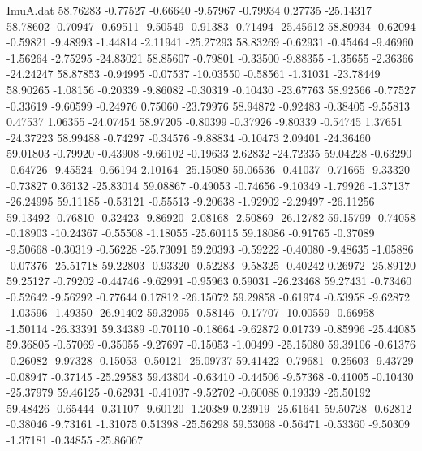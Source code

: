 \begin{filecontents}{ImuA.dat}
  58.76283   -0.77527   -0.66640   -9.57967   -0.79934    0.27735  -25.14317
  58.78602   -0.70947   -0.69511   -9.50549   -0.91383   -0.71494  -25.45612
  58.80934   -0.62094   -0.59821   -9.48993   -1.44814   -2.11941  -25.27293
  58.83269   -0.62931   -0.45464   -9.46960   -1.56264   -2.75295  -24.83021
  58.85607   -0.79801   -0.33500   -9.88355   -1.35655   -2.36366  -24.24247
  58.87853   -0.94995   -0.07537  -10.03550   -0.58561   -1.31031  -23.78449
  58.90265   -1.08156   -0.20339   -9.86082   -0.30319   -0.10430  -23.67763
  58.92566   -0.77527   -0.33619   -9.60599   -0.24976    0.75060  -23.79976
  58.94872   -0.92483   -0.38405   -9.55813    0.47537    1.06355  -24.07454
  58.97205   -0.80399   -0.37926   -9.80339   -0.54745    1.37651  -24.37223
  58.99488   -0.74297   -0.34576   -9.88834   -0.10473    2.09401  -24.36460
  59.01803   -0.79920   -0.43908   -9.66102   -0.19633    2.62832  -24.72335
  59.04228   -0.63290   -0.64726   -9.45524   -0.66194    2.10164  -25.15080
  59.06536   -0.41037   -0.71665   -9.33320   -0.73827    0.36132  -25.83014
  59.08867   -0.49053   -0.74656   -9.10349   -1.79926   -1.37137  -26.24995
  59.11185   -0.53121   -0.55513   -9.20638   -1.92902   -2.29497  -26.11256
  59.13492   -0.76810   -0.32423   -9.86920   -2.08168   -2.50869  -26.12782
  59.15799   -0.74058   -0.18903  -10.24367   -0.55508   -1.18055  -25.60115
  59.18086   -0.91765   -0.37089   -9.50668   -0.30319   -0.56228  -25.73091
  59.20393   -0.59222   -0.40080   -9.48635   -1.05886   -0.07376  -25.51718
  59.22803   -0.93320   -0.52283   -9.58325   -0.40242    0.26972  -25.89120
  59.25127   -0.79202   -0.44746   -9.62991   -0.95963    0.59031  -26.23468
  59.27431   -0.73460   -0.52642   -9.56292   -0.77644    0.17812  -26.15072
  59.29858   -0.61974   -0.53958   -9.62872   -1.03596   -1.49350  -26.91402
  59.32095   -0.58146   -0.17707  -10.00559   -0.66958   -1.50114  -26.33391
  59.34389   -0.70110   -0.18664   -9.62872    0.01739   -0.85996  -25.44085
  59.36805   -0.57069   -0.35055   -9.27697   -0.15053   -1.00499  -25.15080
  59.39106   -0.61376   -0.26082   -9.97328   -0.15053   -0.50121  -25.09737
  59.41422   -0.79681   -0.25603   -9.43729   -0.08947   -0.37145  -25.29583
  59.43804   -0.63410   -0.44506   -9.57368   -0.41005   -0.10430  -25.37979
  59.46125   -0.62931   -0.41037   -9.52702   -0.60088    0.19339  -25.50192
  59.48426   -0.65444   -0.31107   -9.60120   -1.20389    0.23919  -25.61641
  59.50728   -0.62812   -0.38046   -9.73161   -1.31075    0.51398  -25.56298
  59.53068   -0.56471   -0.53360   -9.50309   -1.37181   -0.34855  -25.86067

\end{filecontents}
